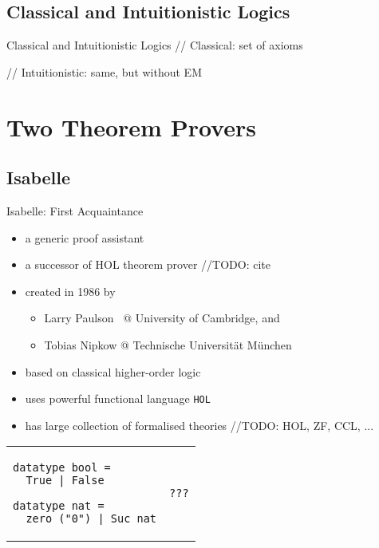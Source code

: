 \documentclass[aspectratio=169]{beamer}
\begin{document}
\subsection{Classical and Intuitionistic Logics}

\begin{frame}{Classical and Intuitionistic Logics}
// Classical: set of axioms

// Intuitionistic: same, but without EM
\end{frame}



\section{Two Theorem Provers}

\subsection{Isabelle}

\begin{frame}[fragile]{Isabelle: First Acquaintance}


\vspace{10pt}
\begin{itemize}
  \item a generic proof assistant
  \item a successor of HOL theorem prover //TODO: cite
  \item created in 1986 by
    \begin{itemize}
    \item Larry Paulson \ @ University of Cambridge, and
    \item Tobias Nipkow @ Technische Universit\"{a}t M\"{u}nchen
    \end{itemize}
  \item based on classical higher-order logic
  \item uses powerful functional language \texttt{HOL}
  \item has large collection of formalised theories  //TODO: HOL, ZF, CCL, ...
\end{itemize}

\begin{tabular}{p{.45\linewidth} p{.45\linewidth}}
\begin{lstlisting}[language=isabelle, caption={Definition of basic datatypes 
%in Isabelle:
}]
datatype bool = 
  True | False
  
datatype nat = 
  zero ("0") | Suc nat
\end{lstlisting}
&
   
\begin{lstlisting}[language=isabelle,caption={???}]
???
\end{lstlisting}
\end{tabular}

\end{frame}
\end{document}
